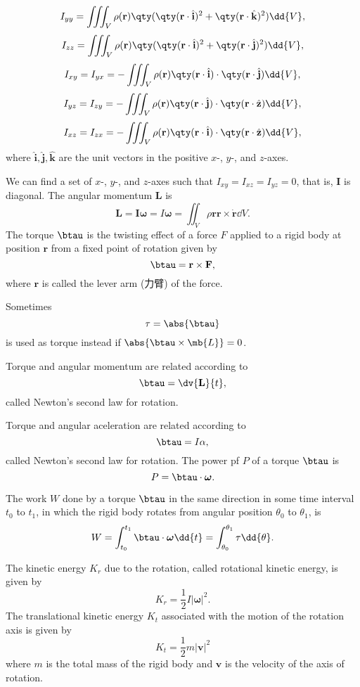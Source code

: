 \documentclass[a4paper,12pt]{article}
\begin{document}
\[I_{yy}=\iiint_V\rho(\mathbf{r})\qty(\qty(\mathbf{r}\cdot\hat{\mathbf{i}})^2+\qty(\mathbf{r}\cdot\hat{\mathbf{k}})^2)\dd{V},\]
\[I_{zz}=\iiint_V\rho(\mathbf{r})\qty(\qty(\mathbf{r}\cdot\hat{\mathbf{i}})^2+\qty(\mathbf{r}\cdot\hat{\mathbf{j}})^2)\dd{V},\]
\[I_{xy}=I_{yx}=-\iiint_V\rho(\mathbf{r})\qty(\mathbf{r}\cdot\hat{\mathbf{i}})\cdot\qty(\mathbf{r}\cdot\hat{\mathbf{j}})\dd{V},\]
\[I_{yz}=I_{zy}=-\iiint_V\rho(\mathbf{r})\qty(\mathbf{r}\cdot\hat{\mathbf{j}})\cdot\qty(\mathbf{r}\cdot\hat{\mathbf{z}})\dd{V},\]
\[I_{xz}=I_{zx}=-\iiint_V\rho(\mathbf{r})\qty(\mathbf{r}\cdot\hat{\mathbf{i}})\cdot\qty(\mathbf{r}\cdot\hat{\mathbf{z}})\dd{V},\]
where $\hat{\mathbf{i}},\hat{\mathbf{j}},\hat{\mathbf{k}}$ are the unit vectors in the positive $x$-, $y$-, and $z$-axes.

We can find a set of $x$-, $y$-, and $z$-axes such that $I_{xy}=I_{xz}=I_{yz}=0$, that is, $\mathbf{I}$ is diagonal.
The angular momentum $\mathbf{L}$ is
\[\mathbf{L}=\mathbf{I}\boldsymbol{\omega}=I\boldsymbol{\omega}=\iint_V\rho{\mathbf{r}}\mathbf{r}\times\dot{\mathbf{r}}\dd{V}.\]
The torque $\btau$ is the twisting effect of a force $F$ applied to a rigid body at position $\mathbf{r}$ from a fixed point of rotation given by
\[\btau=\mathbf{r}\times\mathbf{F},\]
where $\mathbf{r}$ is called the lever arm (力臂) of the force.

Sometimes
\[\tau=\abs{\btau}\]
is used as torque instead if $\abs{\btau\times\mb{L}}=0$.

Torque and angular momentum are related according to
\[\btau=\dv{\mathbf{L}}{t},\]
called Newton's second law for rotation.

Torque and angular aceleration are related according to
\[\btau=I\alpha,\]
called Newton's second law for rotation.
The power pf $P$ of a torque $\btau$ is
\[P=\btau\cdot\boldsymbol{\omega}.\]

The work $W$ done by a torque $\btau$ in the same direction in some time interval $t_0$ to $t_1$, in which the rigid body rotates from angular position $\theta_0$ to $\theta_1$, is
\[W=\int_{t_0}^{t_1}\btau\cdot\boldsymbol{\omega}\dd{t}=\int_{\theta_0}^{\theta_1}\tau\dd{\theta}.\]

The kinetic energy $K_r$ due to the rotation, called rotational kinetic energy, is given by
\[K_r=\frac{1}{2}I|\boldsymbol{\omega}|^2.\]
The translational kinetic energy $K_t$ associated with the motion of the rotation axis is given by
\[K_t=\frac{1}{2}m|\mathbf{v}|^2\]
where $m$ is the total mass of the rigid body and $\mathbf{v}$ is the velocity of the axis of rotation.
\end{document}
